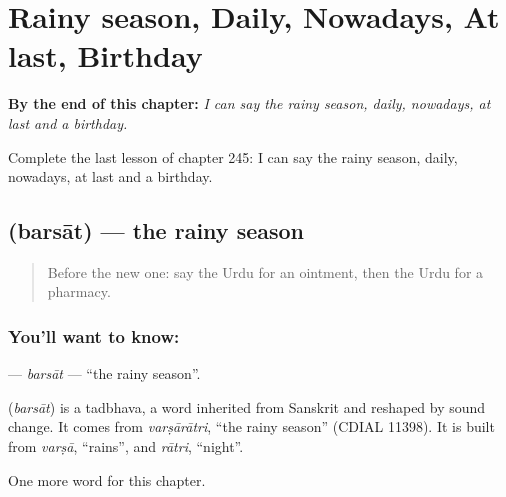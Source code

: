 
\chapter{Rainy season, Daily, Nowadays, At last, Birthday}
\label{ch:ur-rainy-season-daily-nowadays-at-last-birthday}

\begin{chapteropening}
\textbf{By the end of this chapter:} \emph{I can say the rainy season, daily, nowadays, at last and a birthday.}

Complete the last lesson of chapter 245: I can say the rainy season, daily, nowadays, at last and a birthday.
\end{chapteropening}

\section[\texorpdfstring{\ur{برسات} (barsāt)}{برسات (barsāt)}]{ (barsāt) — the rainy season}

\label{lesson:UR-C245-barsat}



\begin{quote}
Before the new one: say the Urdu for an ointment, then the Urdu for a pharmacy.
\end{quote}

\subsection*{You'll want to know: }
\textbf{} — \emph{barsāt} — \textquotedblleft{}the rainy season\textquotedblright{}.

\begin{cousinweb}
\textbf{} (\emph{barsāt}) is a tadbhava, a word inherited from Sanskrit and reshaped by sound change. It comes from \emph{varṣārātri}, \textquotedblleft{}the rainy season\textquotedblright{} (CDIAL 11398). It is built from \emph{varṣā}, \textquotedblleft{}rains\textquotedblright{}, and \emph{rātri}, \textquotedblleft{}night\textquotedblright{}.
\end{cousinweb}

\begin{grammarlens}[title={What you've built}]
One more word for this chapter.
\end{grammarlens}

